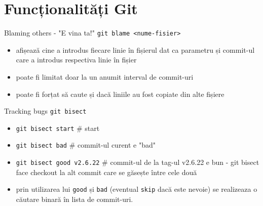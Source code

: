 \documentclass{beamer}
\begin{document}
\section{Funcționalități Git}
\frame{\tableofcontents[currentsection]}
\begin{frame}{Blaming others - "E vina ta!"}
\texttt{git blame <nume-fisier>}
\begin{itemize} %
\item afișează cine a introdus fiecare linie în fișierul dat ca parametru și commit-ul care a introdus respectiva linie în fișier
\item poate fi limitat doar la un anumit interval de commit-uri
\item poate fi forțat să caute și dacă liniile au fost copiate din alte fișiere
\end{itemize}
\end{frame}

\begin{frame}{Tracking bugs}
\texttt{git bisect}
\begin{itemize} %
\item \texttt{git bisect start}  \# start
\item \texttt{git bisect bad} \# commit-ul curent e "bad"
\item \texttt{git bisect good v2.6.22} \# commit-ul de la tag-ul v2.6.22 e bun - git bisect face checkout la alt commit care se găsește între cele două
\item prin utilizarea lui \texttt{good} și \texttt{bad} (eventual \texttt{skip} dacă este nevoie) se realizeaza o căutare binară în lista de commit-uri.
\end{itemize}
\end{frame}

\end{document}
